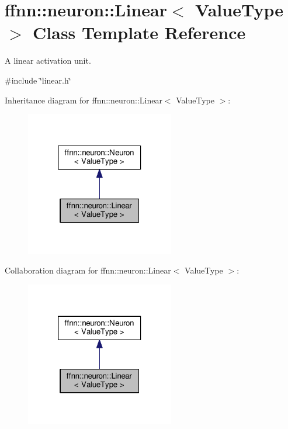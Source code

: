 \hypertarget{classffnn_1_1neuron_1_1_linear}{\section{ffnn\-:\-:neuron\-:\-:Linear$<$ Value\-Type $>$ Class Template Reference}
\label{classffnn_1_1neuron_1_1_linear}
}


A linear activation unit.  




{\ttfamily \#include \char`\"{}linear.\-h\char`\"{}}



Inheritance diagram for ffnn\-:\-:neuron\-:\-:Linear$<$ Value\-Type $>$\-:
\nopagebreak
\begin{figure}[H]
\begin{center}
\leavevmode
\includegraphics[width=184pt]{classffnn_1_1neuron_1_1_linear__inherit__graph}
\end{center}
\end{figure}


Collaboration diagram for ffnn\-:\-:neuron\-:\-:Linear$<$ Value\-Type $>$\-:
\nopagebreak
\begin{figure}[H]
\begin{center}
\leavevmode
\includegraphics[width=184pt]{classffnn_1_1neuron_1_1_linear__coll__graph}
\end{center}
\end{figure}
